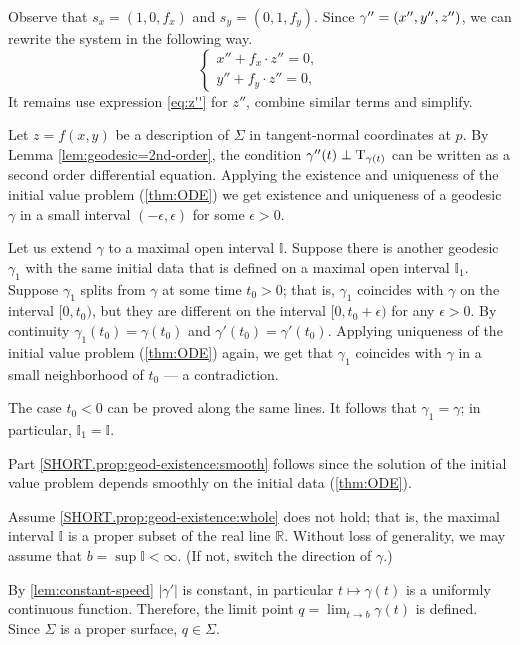 Observe that 
$s_x=(1,0, f_x)$ 
and 
$s_y=(0,1, f_y)$.
Since $\gamma''\z=(x'',y'',z'')$, we can rewrite the system in the following way.
\[
\begin{cases}
x''+ f_x\cdot z''=0,
\\
y''+ f_y\cdot z''=0,
\end{cases}
\]
It remains use expression \ref{eq:z''} for $z''$, combine similar terms and simplify.
\qeds


Let $z=f(x,y)$ be a description of $\Sigma$ in tangent-normal coordinates at $p$.
By Lemma \ref{lem:geodesic=2nd-order}, the condition $\gamma''(t)\perp\mathrm{T}_{\gamma(t)}$ can be written as a second order differential equation.
Applying the existence and uniqueness of the initial value problem (\ref{thm:ODE}) we get existence and uniqueness of a geodesic $\gamma$ in a small interval $(-\epsilon,\epsilon)$ for some $\epsilon>0$.

Let us extend $\gamma$ to a maximal open interval $\mathbb{I}$.
Suppose there is another geodesic $\gamma_1$ with the same initial data that is defined on a maximal open interval $\mathbb{I}_1$.
Suppose $\gamma_1$ splits from $\gamma$ at some time $t_0>0$;
that is, $\gamma_1$ coincides with $\gamma$ on the interval $[0,t_0)$, but they are different on the interval $[0,t_0+\epsilon)$ for any $\epsilon>0$.
By continuity $\gamma_1(t_0)=\gamma(t_0)$ and $\gamma'(t_0)=\gamma'(t_0)$.
Applying uniqueness of the initial value problem (\ref{thm:ODE}) again, we get that $\gamma_1$ coincides with $\gamma$ in a small neighborhood of $t_0$ --- a contradiction.

The case $t_0<0$ can be proved along the same lines.
It follows that $\gamma_1=\gamma$;
in particular, $\mathbb{I}_1=\mathbb{I}$.

Part \ref{SHORT.prop:geod-existence:smooth} follows since the solution of the initial value problem depends smoothly on the initial data (\ref{thm:ODE}).

Assume \ref{SHORT.prop:geod-existence:whole} does not hold;
that is, the maximal interval $\mathbb{I}$ is a proper subset of the real line $\mathbb{R}$.
Without loss of generality, we may assume that $b=\sup\mathbb{I}<\infty$.
(If not, switch the direction of $\gamma$.)

By \ref{lem:constant-speed} $|\gamma'|$ is constant, in particular $t\mapsto \gamma(t)$ is a uniformly continuous function.
Therefore, the limit point
$q=\lim_{t\to b}\gamma(t)$
is defined.
Since $\Sigma$ is a proper surface, $q\in \Sigma$. 

